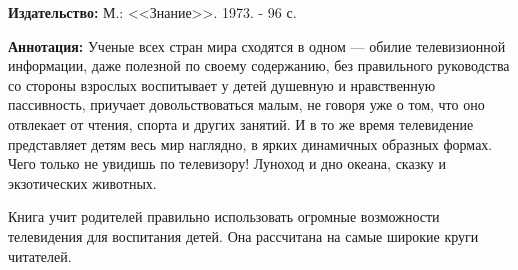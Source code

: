 \documentclass[12pt, a4paper, openany]{book}
\begin{document}
{\bf Издательство:} М.: <<Знание>>. 1973. - 96 с.
	
		{\bf Аннотация:} Ученые всех стран мира сходятся в одном — обилие телевизионной информации, даже полезной по своему содержанию, без правильного руководства со стороны взрослых воспитывает у детей душевную и нравственную пассивность, приучает довольствоваться малым, не говоря уже о том, что оно отвлекает от чтения, спорта и других занятий. И в то же время телевидение представляет детям весь мир наглядно, в ярких динамичных образных формах. Чего только не увидишь по телевизору! Луноход и дно океана, сказку и экзотических животных. 
		
		Книга учит родителей правильно использовать огромные возможности телевидения для воспитания детей. Она рассчитана на самые широкие круги читателей. 
		


		\thispagestyle{empty} %

	
\end{document}
